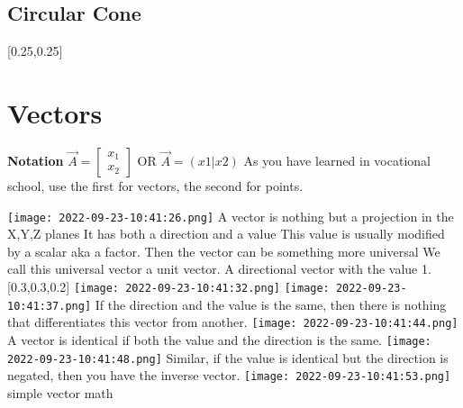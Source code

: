 \documentclass[main.tex,fontsize=8pt,paper=a4,paper=portrait,DIV=calc,]{scrartcl}
\begin{document}
\begin{multicols*}{2}
\subsection{Circular Cone}
[0.25,0.25]

\section{Vectors}
\textbf{Notation} \( \vec{A} = \begin{bmatrix}x_{1} \\ x_{2} \end{bmatrix} \) OR \(\vec{A} = (x1 | x2)\)\newline
As you have learned in vocational school, use the first for vectors, the second for points.\newline

\texttt{[image: 2022-09-23-10:41:26.png]}
{A vector is nothing but a projection in the X,Y,Z planes \newline 
It has both a direction and a value \newline
This value is usually modified by a scalar aka a factor. Then the vector can be something more universal \newline
We call this universal vector a unit vector. A directional vector with the value 1.}[0.3,0.3,0.2]\newline
\texttt{[image: 2022-09-23-10:41:32.png]}
\texttt{[image: 2022-09-23-10:41:37.png]}\newline
If the direction and the value is the same, then there is nothing that differentiates this vector from another.\newline
\texttt{[image: 2022-09-23-10:41:44.png]}\newline
A vector is identical if both the value and the direction is the same.\newline
\texttt{[image: 2022-09-23-10:41:48.png]}\newline 
Similar, if the value is identical but the direction is negated, then you have the inverse vector.\newline
\texttt{[image: 2022-09-23-10:41:53.png]}\newline 
simple vector math \newline

\end{multicols*}
\end{document}
